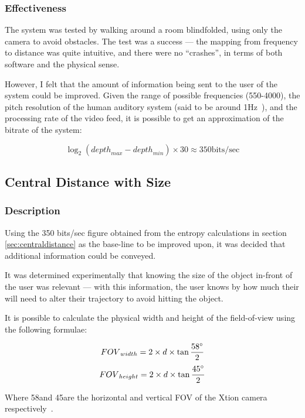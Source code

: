 \subsubsection{Effectiveness}
The system was tested by walking around a room blindfolded, using only the camera to avoid obstacles. The test was a success --- the mapping from frequency to distance was quite intuitive, and there were no ``crashes'', in terms of both software and the physical sense.

However, I felt that the amount of information being sent to the user of the system could be improved. Given the range of possible frequencies (550-4000), the pitch resolution of the human auditory system (said to be around 1Hz~\cite{pitchres}), and the processing rate of the video feed, it is possible to get an approximation of the bitrate of the system:

\begin{equation}
\log _2\left({depth}_{max} - {depth}_{min}\right) \times 30 \approx 350 \mbox{bits/sec}
\end{equation}

\subsection{Central Distance with Size}
\subsubsection{Description}
Using the 350 bits/sec figure obtained from the entropy calculations in section \ref{sec:centraldistance} as the base-line to be improved upon, it was decided that additional information could be conveyed.

It was determined experimentally that knowing the size of the object in-front of the user was relevant --- with this information, the user knows by how much their will need to alter their trajectory to avoid hitting the object. 

It is possible to calculate the physical width and height of the field-of-view using the following formulae:

\begin{equation}
{FOV}_{width} = 2 \times d \times \tan\frac{58\degree}{2}
\end{equation}
\begin{equation}
{FOV}_{height} = 2 \times d \times \tan\frac{45\degree}{2}
\end{equation}

Where 58\degree  and 45\degree  are the horizontal and vertical \ac{FOV} of the Xtion camera respectively~\cite{xtion-spec}. 

